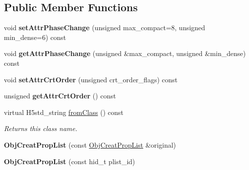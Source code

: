 \subsection*{Public Member Functions}
\begin{DoxyCompactItemize}
\item 
\mbox{\label{class_h5_1_1_obj_creat_prop_list_ab13496855d98c16dce84651c2699a387}} 
void {\bfseries set\+Attr\+Phase\+Change} (unsigned max\+\_\+compact=8, unsigned min\+\_\+dense=6) const
\item 
\mbox{\label{class_h5_1_1_obj_creat_prop_list_a59f73f911416e2b7729f625ac640e7cd}} 
void {\bfseries get\+Attr\+Phase\+Change} (unsigned \&max\+\_\+compact, unsigned \&min\+\_\+dense) const
\item 
\mbox{\label{class_h5_1_1_obj_creat_prop_list_ad092706f141a7b9cc7eea74bef75344e}} 
void {\bfseries set\+Attr\+Crt\+Order} (unsigned crt\+\_\+order\+\_\+flags) const
\item 
\mbox{\label{class_h5_1_1_obj_creat_prop_list_af12042cacf15023ecc0b0f1e2ad621cd}} 
unsigned {\bfseries get\+Attr\+Crt\+Order} () const
\item 
\mbox{\label{class_h5_1_1_obj_creat_prop_list_aa9e5e054947c19ae8eaab5e4e938fc2c}} 
virtual H5std\+\_\+string \hyperlink{class_h5_1_1_obj_creat_prop_list_aa9e5e054947c19ae8eaab5e4e938fc2c}{from\+Class} () const
\begin{DoxyCompactList}\small\item\em Returns this class name. \end{DoxyCompactList}\item 
\mbox{\label{class_h5_1_1_obj_creat_prop_list_a209b2314987f497c89d7ce47577aa88f}} 
{\bfseries Obj\+Creat\+Prop\+List} (const \hyperlink{class_h5_1_1_obj_creat_prop_list}{Obj\+Creat\+Prop\+List} \&original)
\item 
\mbox{\label{class_h5_1_1_obj_creat_prop_list_a54856cf6703377c66340303a3a8442c3}} 
{\bfseries Obj\+Creat\+Prop\+List} (const hid\+\_\+t plist\+\_\+id)

\end{DoxyCompactItemize}
